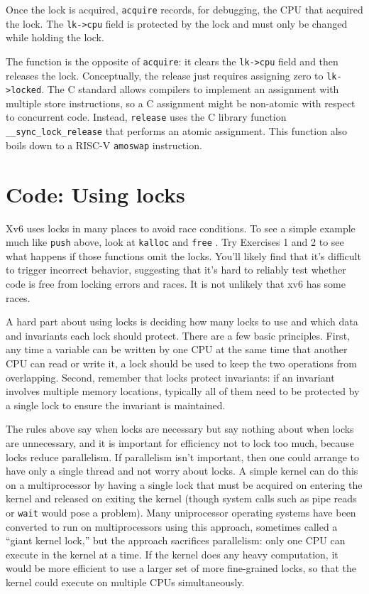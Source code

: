 Once the lock is acquired,
\lstinline{acquire}
records, for debugging, the CPU 
that acquired the lock.
The
\lstinline{lk->cpu}
field is protected by the lock
and must only be changed while holding the lock.

The function
is the opposite of 
\lstinline{acquire}:
it clears the 
\lstinline{lk->cpu}
field
and then releases the lock.
Conceptually, the release just requires assigning zero to
\lstinline{lk->locked}.
The C standard allows compilers to implement an assignment
with multiple store instructions,
so a C assignment might be non-atomic with respect
to concurrent code.
Instead,
\lstinline{release}
uses the C library function
\lstinline{__sync_lock_release}
that performs an atomic assignment.
This function also boils down to a RISC-V
\lstinline{amoswap}
instruction.
\section{Code: Using locks}
Xv6 uses locks in many places to avoid race conditions.
To see a simple example much like
\lstinline{push}
above,
look at
\lstinline{kalloc}
and
\lstinline{free}
.
Try Exercises 1 and 2 to see what happens if those
functions omit the locks.
You'll likely find that it's difficult to trigger incorrect
behavior, suggesting that it's hard to reliably test whether code
is free from locking errors and races.
It is not unlikely that xv6 has some races.

A hard part about using locks is deciding how many locks
to use and which data and invariants each lock should protect.
There are a few basic principles.
First, any time a variable can be written by one CPU
at the same time that another CPU can read or write it,
a lock should be used to keep the two
operations from overlapping.
Second, remember that locks protect invariants:
if an invariant involves multiple memory locations,
typically all of them need to be protected
by a single lock to ensure the invariant is maintained.

The rules above say when locks are necessary but say nothing about when locks
are unnecessary, and it is important for efficiency not to lock too much,
because locks reduce parallelism.  If parallelism isn't important, then one
could arrange to have only a single thread and not worry about locks.  A simple
kernel can do this on a multiprocessor by having a single lock that must be
acquired on entering the kernel and released on exiting the kernel (though
system calls such as pipe reads or
\lstinline{wait}
would pose a problem).  Many uniprocessor operating systems have been converted to
run on multiprocessors using this approach, sometimes called a ``giant
kernel lock,'' but the approach sacrifices parallelism: only one
CPU can execute in the kernel at a time.  If the kernel does any heavy
computation, it would be more efficient to use a larger set of more
fine-grained locks, so that the kernel could execute on multiple CPUs
simultaneously.

